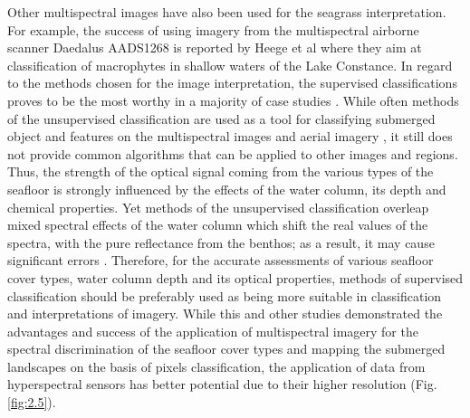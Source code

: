 \documentclass[10pt, a4paper]{article}
\begin{document}
Other multispectral images have also been used for the
seagrass interpretation. For example, the success of using imagery from the multispectral airborne
scanner Daedalus AADS1268 is reported by Heege et al \cite{Heege03}\label{Heege03} where they aim at classification of
macrophytes in shallow waters of the Lake Constance. 
In regard to the methods chosen for the image interpretation, the supervised classifications proves to
be the most worthy in a majority of case studies \cite{Palandro03,Peneva08}\label{Palandro03}\label{Peneva08}. While
often methods of the unsupervised classification are used as a tool for classifying submerged object
and features on the multispectral images and aerial imagery \cite{Fletcher09}\label{Fletcher09}, it still does not
provide common algorithms that can be applied to other images and regions. Thus, the strength of the
optical signal coming from the various types of the seafloor is strongly influenced by the effects of the
water column, its depth and chemical properties. Yet methods of the unsupervised classification
overleap mixed spectral effects of the water column which shift the real values of the spectra, with the
pure reflectance from the benthos; as a result, it may cause significant errors \cite{Dierssen03}\label{Dierssen03}.
Therefore, for the accurate assessments of various seafloor cover types, water
column depth and its optical properties, methods of supervised classification should be preferably
used as being more suitable in classification and interpretations of imagery.
While this and other studies \cite{Phinn08}\label{Phinn08} demonstrated the advantages and success of the
application of multispectral imagery for the spectral discrimination of the seafloor cover types and
mapping the submerged landscapes on the basis of pixels classification, the application of data from
hyperspectral sensors has better potential due to their higher resolution (Fig.\ref{fig:2.5}).
\end{document}
